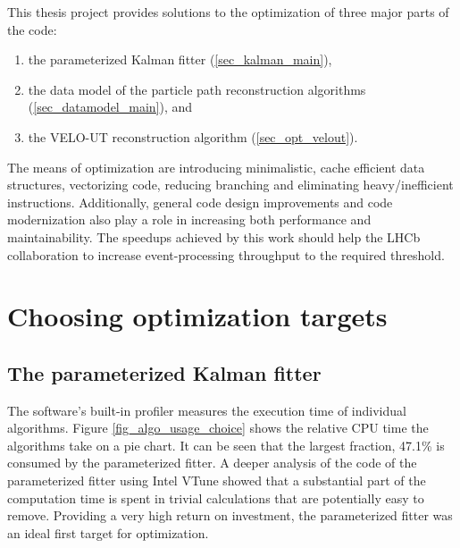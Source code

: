 \documentclass[12pt]{article}
\begin{document}
\vspace{1pc}
This thesis project provides solutions to the optimization of three major parts of the code:
\begin{enumerate}
	\item the parameterized Kalman fitter (\ref{sec_kalman_main}),
	\item the data model of the particle path reconstruction algorithms (\ref{sec_datamodel_main}), and
	\item the VELO-UT reconstruction algorithm (\ref{sec_opt_velout}).
\end{enumerate}
The means of optimization are introducing minimalistic, cache efficient data structures, vectorizing code, reducing branching and eliminating heavy/inefficient instructions. Additionally, general code design improvements and code modernization also play a role in increasing both performance and maintainability. The speedups achieved by this work should help the LHCb collaboration to increase event-processing throughput to the required threshold.


\newpage
\section{Choosing optimization targets}

\subsection{The parameterized Kalman fitter}

The software's built-in profiler measures the execution time of individual algorithms. Figure \ref{fig_algo_usage_choice} shows the relative CPU time the algorithms take on a pie chart. It can be seen that the largest fraction, 47.1\% is consumed by the parameterized fitter. A deeper analysis of the code of the parameterized fitter using Intel VTune showed that a substantial part of the computation time is spent in trivial calculations that are potentially easy to remove. Providing a very high return on investment, the parameterized fitter was an ideal first target for optimization.
\end{document}
